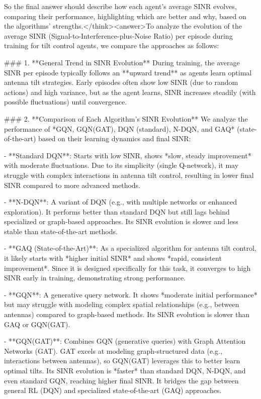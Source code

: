 So the final answer should describe how each agent's average SINR evolves, comparing their performance, highlighting which are better and why, based on the algorithms' strengths.</think><answer>To analyze the evolution of the average SINR (Signal-to-Interference-plus-Noise Ratio) per episode during training for tilt control agents, we compare the approaches as follows:  


### 1. **General Trend in SINR Evolution**  
During training, the average SINR per episode typically follows an **upward trend** as agents learn optimal antenna tilt strategies. Early episodes often show low SINR (due to random actions) and high variance, but as the agent learns, SINR increases steadily (with possible fluctuations) until convergence.  


### 2. **Comparison of Each Algorithm’s SINR Evolution**  
We analyze the performance of *GQN, GQN(GAT), DQN (standard), N-DQN, and GAQ* (state-of-the-art) based on their learning dynamics and final SINR:  

- **Standard DQN**:  
  Starts with low SINR, shows *slow, steady improvement* with moderate fluctuations. Due to its simplicity (single Q-network), it may struggle with complex interactions in antenna tilt control, resulting in lower final SINR compared to more advanced methods.  

- **N-DQN**:  
  A variant of DQN (e.g., with multiple networks or enhanced exploration). It performs better than standard DQN but still lags behind specialized or graph-based approaches. Its SINR evolution is slower and less stable than state-of-the-art methods.  

- **GAQ (State-of-the-Art)**:  
  As a specialized algorithm for antenna tilt control, it likely starts with *higher initial SINR* and shows *rapid, consistent improvement*. Since it is designed specifically for this task, it converges to high SINR early in training, demonstrating strong performance.  

- **GQN**:  
  A generative query network. It shows *moderate initial performance* but may struggle with modeling complex spatial relationships (e.g., between antennas) compared to graph-based methods. Its SINR evolution is slower than GAQ or GQN(GAT).  

- **GQN(GAT)**:  
  Combines GQN (generative queries) with Graph Attention Networks (GAT). GAT excels at modeling graph-structured data (e.g., interactions between antennas), so GQN(GAT) leverages this to better learn optimal tilts. Its SINR evolution is *faster* than standard DQN, N-DQN, and even standard GQN, reaching higher final SINR. It bridges the gap between general RL (DQN) and specialized state-of-the-art (GAQ) approaches.  


